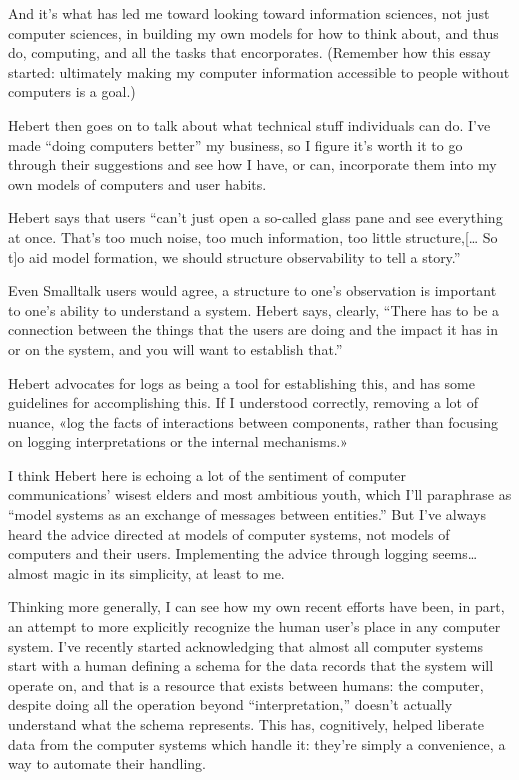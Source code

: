 \documentclass[11pt]{article}
\begin{document}
\begin{itemize}
And it’s what has led me toward looking toward information sciences, not just computer sciences, in building my own models for how to think about, and thus do, computing, and all the tasks that encorporates. (Remember how this essay started: ultimately making my computer information accessible to people without computers is a goal.)

Hebert then goes on to talk about what technical stuff individuals can do. I’ve made “doing computers better” my business, so I figure it’s worth it to go through their suggestions and see how I have, or can, incorporate them into my own models of computers and user habits.

Hebert says that users “can't just open a so-called glass pane and see everything at once. That's too much noise, too much information, too little structure,[… So t]o aid model formation, we should structure observability to tell a story.”

Even Smalltalk users would agree, a structure to one’s observation is important to one’s ability to understand a system. Hebert says, clearly, “There has to be a connection between the things that the users are doing and the impact it has in or on the system, and you will want to establish that.”

Hebert advocates for logs as being a tool for establishing this, and has some guidelines for accomplishing this. If I understood correctly, removing a lot of nuance, «log the facts of interactions between components, rather than focusing on logging interpretations or the internal mechanisms.»

I think Hebert here is echoing a lot of the sentiment of computer communications’ wisest elders and most ambitious youth, which I’ll paraphrase as “model systems as an exchange of messages between entities.” But I’ve always heard the advice directed at models of computer systems, not models of computers and their users. Implementing the advice through logging seems… almost magic in its simplicity, at least to me.

Thinking more generally, I can see how my own recent efforts have been, in part, an attempt to more explicitly recognize the human user’s place in any computer system. I’ve recently started acknowledging that almost all computer systems start with a human defining a schema for the data records that the system will operate on, and that is a resource that exists between humans: the computer, despite doing all the operation beyond “interpretation,” doesn’t actually understand what the schema represents. This has, cognitively, helped liberate data from the computer systems which handle it: they’re simply a convenience, a way to automate their handling.


\end{itemize}
\end{document}
